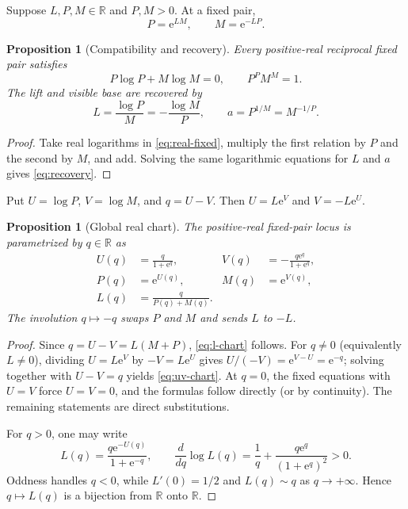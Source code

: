 \documentclass[11pt]{article}
\newtheorem{proposition}[theorem]{Proposition}
\theoremstyle{definition}
\theoremstyle{remark}
\newcommand{\R}{\mathbb R}
\newcommand{\e}{\mathrm e}
\begin{document}
Suppose $L,P,M\in\R$ and $P,M>0$.  At a fixed pair,
\begin{equation}
  P=\e^{LM},\qquad M=\e^{-LP}.
  \label{eq:real-fixed}
\end{equation}

\begin{proposition}[Compatibility and recovery]\label{prop:real-compat}
Every positive-real reciprocal fixed pair satisfies
\begin{equation}
  P\log P+M\log M=0,
  \qquad P^P M^M=1.
  \label{eq:compatibility}
\end{equation}
The lift and visible base are recovered by
\begin{equation}
  L=\frac{\log P}{M}=-\frac{\log M}{P},
  \qquad a=P^{1/M}=M^{-1/P}.
  \label{eq:recovery}
\end{equation}
\end{proposition}

\begin{proof}
Take real logarithms in \cref{eq:real-fixed}, multiply the first relation by $P$ and the second by $M$, and add.  Solving the same logarithmic equations for $L$ and $a$ gives \cref{eq:recovery}.
\end{proof}

Put $U=\log P$, $V=\log M$, and $q=U-V$.  Then $U=L\e^V$ and $V=-L\e^U$.

\begin{proposition}[Global real chart]\label{prop:q-chart}
The positive-real fixed-pair locus is parametrized by $q\in\R$ as
\begin{align}
  U(q)&=\frac{q}{1+\e^q},
  &V(q)&=-\frac{q\e^q}{1+\e^q},\label{eq:uv-chart}\\
  P(q)&=\e^{U(q)},
  &M(q)&=\e^{V(q)},\label{eq:pm-chart}\\
  L(q)&=\frac{q}{P(q)+M(q)}.\label{eq:l-chart}
\end{align}
The involution $q\mapsto-q$ swaps $P$ and $M$ and sends $L$ to $-L$.
\end{proposition}

\begin{proof}
Since $q=U-V=L(M+P)$, \cref{eq:l-chart} follows.  For $q\ne0$ (equivalently $L\ne0$), dividing $U=L\e^V$ by $-V=L\e^U$ gives $U/(-V)=\e^{V-U}=\e^{-q}$; solving together with $U-V=q$ yields \cref{eq:uv-chart}.  At $q=0$, the fixed equations with $U=V$ force $U=V=0$, and the formulas follow directly (or by continuity).  The remaining statements are direct substitutions.

For $q>0$, one may write
\[
  L(q)=\frac{q\e^{-U(q)}}{1+\e^{-q}},
  \qquad
  \frac{d}{dq}\log L(q)=\frac1q+\frac{q\e^q}{(1+\e^q)^2}>0.
\]
Oddness handles $q<0$, while $L'(0)=1/2$ and $L(q)\sim q$ as $q\to+\infty$.  Hence $q\mapsto L(q)$ is a bijection from $\R$ onto $\R$.
\end{proof}
\end{document}
